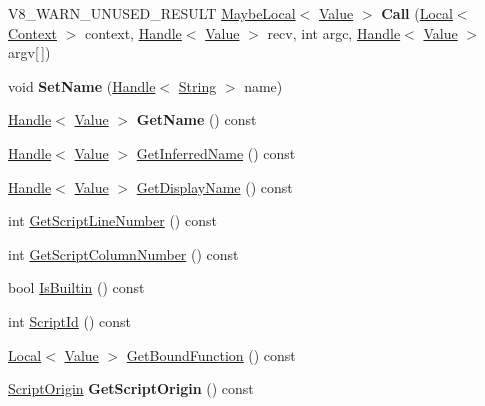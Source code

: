 \begin{DoxyCompactItemize}
\item 
\hypertarget{classv8_1_1_function_a2156c20153157ec8712f32c601e69a46}{}V8\+\_\+\+W\+A\+R\+N\+\_\+\+U\+N\+U\+S\+E\+D\+\_\+\+R\+E\+S\+U\+L\+T \hyperlink{classv8_1_1_maybe_local}{Maybe\+Local}$<$ \hyperlink{classv8_1_1_value}{Value} $>$ {\bfseries Call} (\hyperlink{classv8_1_1_local}{Local}$<$ \hyperlink{classv8_1_1_context}{Context} $>$ context, \hyperlink{classv8_1_1_local}{Handle}$<$ \hyperlink{classv8_1_1_value}{Value} $>$ recv, int argc, \hyperlink{classv8_1_1_local}{Handle}$<$ \hyperlink{classv8_1_1_value}{Value} $>$ argv\mbox{[}$\,$\mbox{]})\label{classv8_1_1_function_a2156c20153157ec8712f32c601e69a46}

\item 
\hypertarget{classv8_1_1_function_a5e244ce13d6f30ffa69f520126ada795}{}void {\bfseries Set\+Name} (\hyperlink{classv8_1_1_local}{Handle}$<$ \hyperlink{classv8_1_1_string}{String} $>$ name)\label{classv8_1_1_function_a5e244ce13d6f30ffa69f520126ada795}

\item 
\hypertarget{classv8_1_1_function_adbbf95a036859381c06af3d05cd74b07}{}\hyperlink{classv8_1_1_local}{Handle}$<$ \hyperlink{classv8_1_1_value}{Value} $>$ {\bfseries Get\+Name} () const \label{classv8_1_1_function_adbbf95a036859381c06af3d05cd74b07}

\item 
\hyperlink{classv8_1_1_local}{Handle}$<$ \hyperlink{classv8_1_1_value}{Value} $>$ \hyperlink{classv8_1_1_function_a5bd3ad2f8144be5d9b383b1cd9b30df5}{Get\+Inferred\+Name} () const 
\item 
\hyperlink{classv8_1_1_local}{Handle}$<$ \hyperlink{classv8_1_1_value}{Value} $>$ \hyperlink{classv8_1_1_function_a02e860b1d4f1b58a0c437fec8ea9e290}{Get\+Display\+Name} () const 
\item 
int \hyperlink{classv8_1_1_function_ae64de1b9dc1ea5dc4f419a88808c12c5}{Get\+Script\+Line\+Number} () const 
\item 
int \hyperlink{classv8_1_1_function_abfe6a9251c5dfc995b83dcf3032fdc86}{Get\+Script\+Column\+Number} () const 
\item 
bool \hyperlink{classv8_1_1_function_a4279e2bfca281cda9afdaf86c87d644d}{Is\+Builtin} () const 
\item 
int \hyperlink{classv8_1_1_function_afa208e62e702f6d61ba0a4250ba3f2cf}{Script\+Id} () const 
\item 
\hyperlink{classv8_1_1_local}{Local}$<$ \hyperlink{classv8_1_1_value}{Value} $>$ \hyperlink{classv8_1_1_function_a937dc089e1ef728eec4a628072250e4d}{Get\+Bound\+Function} () const 
\item 
\hypertarget{classv8_1_1_function_af9c77c9bcbf698727071c7153e7c2513}{}\hyperlink{classv8_1_1_script_origin}{Script\+Origin} {\bfseries Get\+Script\+Origin} () const \label{classv8_1_1_function_af9c77c9bcbf698727071c7153e7c2513}

\end{DoxyCompactItemize}
